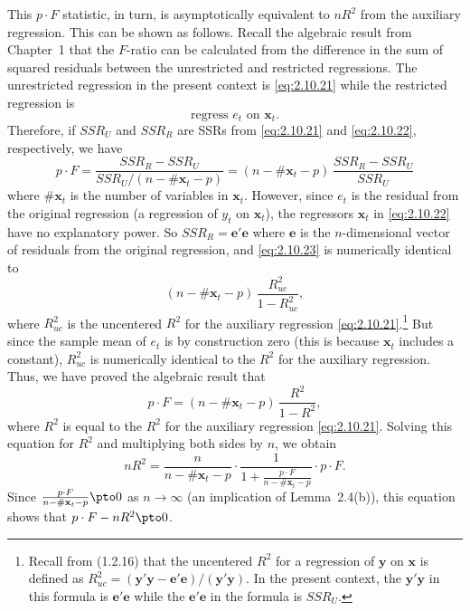 This $p \cdot F$ statistic, in turn, is asymptotically equivalent to $nR^2$ from the auxiliary regression. This can be shown as follows. Recall the algebraic result from
Chapter~1 that the $F$-ratio can be calculated from the difference in the sum of
squared residuals between the unrestricted and restricted regressions. The unrestricted regression in the present context is \eqref{eq:2.10.21} while the restricted regression is
%
\begin{equation}
\text{regress } e_t \text{ on } \mathbf{x}_t.
\label{eq:2.10.22}
\end{equation}
%
Therefore, if $SSR_U$ and $SSR_R$ are SSRs from \eqref{eq:2.10.21} and \eqref{eq:2.10.22}, respectively,
we have
%
\begin{equation}
p \cdot F = \frac{SSR_R - SSR_U}{SSR_U/(n - \#\mathbf{x}_t - p)}
= (n - \#\mathbf{x}_t - p)\,\frac{SSR_R - SSR_U}{SSR_U}
\label{eq:2.10.23}
\end{equation}
%
where $\#\mathbf{x}_t$ is the number of variables in $\mathbf{x}_t$. However, since $e_t$ is the residual from
the original regression (a regression of $y_t$ on $\mathbf{x}_t$), the regressors $\mathbf{x}_t$ in \eqref{eq:2.10.22} have
no explanatory power. So $SSR_R = \mathbf{e}'\mathbf{e}$ where $\mathbf{e}$ is the $n$-dimensional vector of
residuals from the original regression, and \eqref{eq:2.10.23} is numerically identical to
\[
(n - \#\mathbf{x}_t - p)\,\frac{R_{uc}^2}{1 - R_{uc}^2},
\]
where $R_{uc}^2$ is the uncentered $R^2$ for the auxiliary regression \eqref{eq:2.10.21}.\footnote{Recall from (1.2.16) that the uncentered $R^2$ for a regression of $\mathbf{y}$ on $\mathbf{x}$ is defined as
$R_{uc}^2 = (\mathbf{y}'\mathbf{y} - \mathbf{e}'\mathbf{e})/(\mathbf{y}'\mathbf{y})$.
In the present context, the $\mathbf{y}'\mathbf{y}$ in this formula is $\mathbf{e}'\mathbf{e}$ while the $\mathbf{e}'\mathbf{e}$ in the formula is $SSR_U$.}
But since the sample mean of $e_t$ is by construction zero (this is because $\mathbf{x}_t$ includes a constant), $R_{uc}^2$ is numerically identical to the $R^2$ for the auxiliary regression. Thus, we
have proved the algebraic result that
\[
p \cdot F = (n - \#\mathbf{x}_t - p)\,\frac{R^2}{1 - R^2},
\]
where $R^2$ is equal to the $R^2$ for the auxiliary regression \eqref{eq:2.10.21}. Solving this
equation for $R^2$ and multiplying both sides by $n$, we obtain
\[
nR^2 = \frac{n}{n - \#\mathbf{x}_t - p} \cdot
\frac{1}{1 + \frac{p \cdot F}{n - \#\mathbf{x}_t - p}} \cdot p \cdot F.
\]
Since $\frac{p \cdot F}{n - \#\mathbf{x}_t - p} \pto 0$ as $n \to \infty$
(an implication of Lemma~2.4(b)), this equation shows that $p \cdot F - nR^2 \pto 0$.
